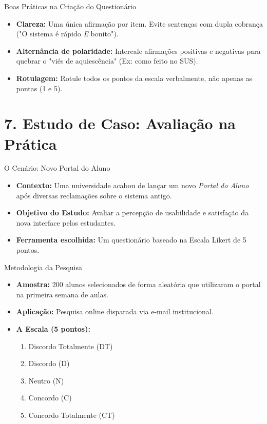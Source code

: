 \documentclass[aspectratio=169]{beamer}
\begin{document}
\begin{frame}{Boas Práticas na Criação do Questionário}
    \begin{itemize}
        \item \textbf{Clareza:} Uma única afirmação por item. Evite sentenças com dupla cobrança ("O sistema é rápido \textit{E} bonito").
        \item \textbf{Alternância de polaridade:} Intercale afirmações positivas e negativas para quebrar o "viés de aquiescência" (Ex: como feito no SUS).
        \item \textbf{Rotulagem:} Rotule todos os pontos da escala verbalmente, não apenas as pontas (1 e 5).
    \end{itemize}
\end{frame}

\section{7. Estudo de Caso: Avaliação na Prática}

\begin{frame}{O Cenário: Novo Portal do Aluno}
    \begin{itemize}
        \item \textbf{Contexto:} Uma universidade acabou de lançar um novo \textit{Portal do Aluno} após diversas reclamações sobre o sistema antigo.
        \item \textbf{Objetivo do Estudo:} Avaliar a percepção de usabilidade e satisfação da nova interface pelos estudantes.
        \item \textbf{Ferramenta escolhida:} Um questionário baseado na Escala Likert de 5 pontos.
    \end{itemize}
\end{frame}

\begin{frame}{Metodologia da Pesquisa}
    \begin{itemize}
        \item \textbf{Amostra:} 200 alunos selecionados de forma aleatória que utilizaram o portal na primeira semana de aulas.
        \item \textbf{Aplicação:} Pesquisa online disparada via e-mail institucional.
        \item \textbf{A Escala (5 pontos):} 
        \begin{enumerate}
            \item Discordo Totalmente (DT)
            \item Discordo (D)
            \item Neutro (N)
            \item Concordo (C)
            \item Concordo Totalmente (CT)
        \end{enumerate}
    \end{itemize}
\end{frame}
\end{document}
